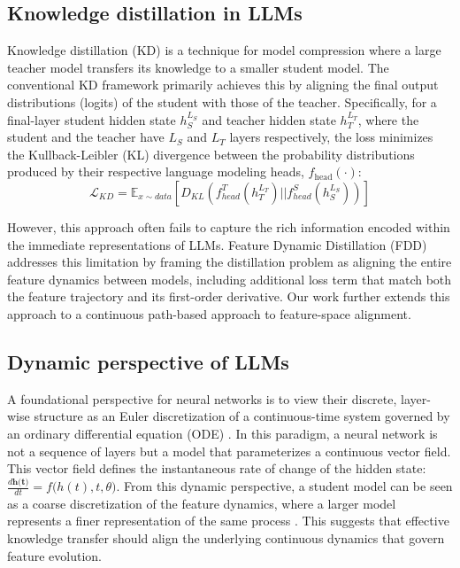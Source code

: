 \documentclass{article} %
\theoremstyle{definition}
\theoremstyle{remark}
\begin{document}
\subsection{Knowledge distillation in LLMs}
Knowledge distillation (KD) \cite{hinton2015distillingknowledgeneuralnetwork} is a technique for model compression where a large teacher model transfers its knowledge to a smaller student model. The conventional KD framework primarily achieves this by aligning the final output distributions (logits) of the student with those of the teacher. Specifically, for a final-layer student hidden state $h_S^{L_S}$ and teacher hidden state $h_T^{L_T}$, where the student and the teacher have $L_S$ and $L_T$ layers respectively, the loss minimizes the Kullback-Leibler (KL) divergence between the probability distributions produced by their respective language modeling heads, $f_{\text{head}}(\cdot)$:
\begin{equation}
\mathcal{L}_{KD}=\mathbb{E}_{x\sim data}[D_{KL}(f_{head}^{T}(h_{T}^{L_{T}})||f_{head}^{S}(h_{S}^{L_{S}}))]
\end{equation}

However, this approach often fails to capture the rich information encoded within the immediate representations of LLMs. Feature Dynamic Distillation (FDD) \cite{gong-etal-2025-beyond} addresses this limitation by framing the distillation problem as aligning the entire feature dynamics between models, including additional loss term that match both the feature trajectory and its first-order derivative. Our work further extends this approach to a continuous path-based approach to feature-space alignment. 

\subsection{Dynamic perspective of LLMs}
A foundational perspective for neural networks is to view their discrete, layer-wise structure as an Euler discretization of a continuous-time system governed by an ordinary differential equation (ODE) \cite{chen2019neuralordinarydifferentialequations}. In this paradigm, a neural network is not a sequence of layers but a model that parameterizes a continuous vector field. This vector field defines the instantaneous rate of change of the hidden state: $\frac{d\textbf{h(t})}{dt} = f\big(h(t), t, \theta\big)$. From this dynamic perspective, a student model can be seen as a coarse discretization of the feature dynamics, where a larger model represents a finer representation of the same process \cite{gong-etal-2025-beyond}. This suggests that effective knowledge transfer should align the underlying continuous dynamics that govern feature evolution.
\end{document}
